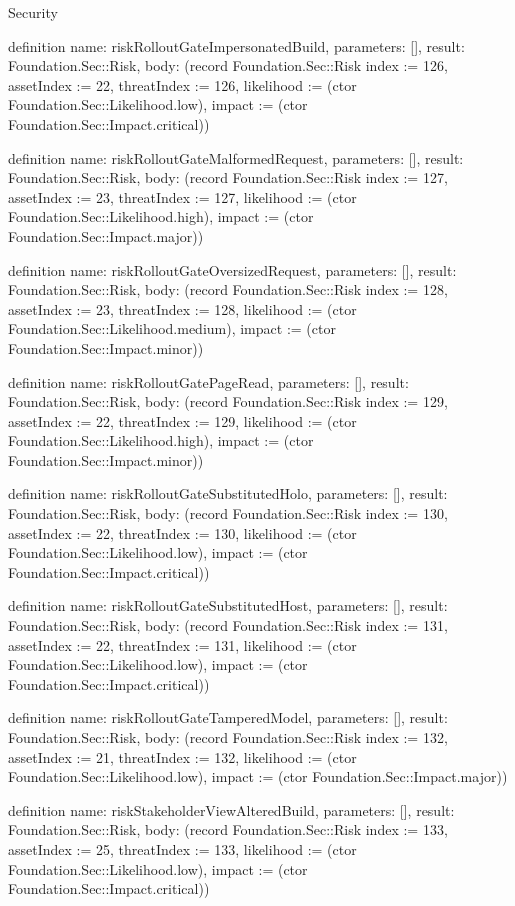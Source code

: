 \begin{lexlean}{Security}
\begin{semanticmodule}
definition{
  name: riskRolloutGateImpersonatedBuild,
  parameters: [],
  result: Foundation.Sec::Risk,
  body: (record Foundation.Sec::Risk {index := 126, assetIndex := 22, threatIndex := 126, likelihood := (ctor Foundation.Sec::Likelihood.low), impact := (ctor Foundation.Sec::Impact.critical)})
}

definition{
  name: riskRolloutGateMalformedRequest,
  parameters: [],
  result: Foundation.Sec::Risk,
  body: (record Foundation.Sec::Risk {index := 127, assetIndex := 23, threatIndex := 127, likelihood := (ctor Foundation.Sec::Likelihood.high), impact := (ctor Foundation.Sec::Impact.major)})
}

definition{
  name: riskRolloutGateOversizedRequest,
  parameters: [],
  result: Foundation.Sec::Risk,
  body: (record Foundation.Sec::Risk {index := 128, assetIndex := 23, threatIndex := 128, likelihood := (ctor Foundation.Sec::Likelihood.medium), impact := (ctor Foundation.Sec::Impact.minor)})
}

definition{
  name: riskRolloutGatePageRead,
  parameters: [],
  result: Foundation.Sec::Risk,
  body: (record Foundation.Sec::Risk {index := 129, assetIndex := 22, threatIndex := 129, likelihood := (ctor Foundation.Sec::Likelihood.high), impact := (ctor Foundation.Sec::Impact.minor)})
}

definition{
  name: riskRolloutGateSubstitutedHolo,
  parameters: [],
  result: Foundation.Sec::Risk,
  body: (record Foundation.Sec::Risk {index := 130, assetIndex := 22, threatIndex := 130, likelihood := (ctor Foundation.Sec::Likelihood.low), impact := (ctor Foundation.Sec::Impact.critical)})
}

definition{
  name: riskRolloutGateSubstitutedHost,
  parameters: [],
  result: Foundation.Sec::Risk,
  body: (record Foundation.Sec::Risk {index := 131, assetIndex := 22, threatIndex := 131, likelihood := (ctor Foundation.Sec::Likelihood.low), impact := (ctor Foundation.Sec::Impact.critical)})
}

definition{
  name: riskRolloutGateTamperedModel,
  parameters: [],
  result: Foundation.Sec::Risk,
  body: (record Foundation.Sec::Risk {index := 132, assetIndex := 21, threatIndex := 132, likelihood := (ctor Foundation.Sec::Likelihood.low), impact := (ctor Foundation.Sec::Impact.major)})
}

definition{
  name: riskStakeholderViewAlteredBuild,
  parameters: [],
  result: Foundation.Sec::Risk,
  body: (record Foundation.Sec::Risk {index := 133, assetIndex := 25, threatIndex := 133, likelihood := (ctor Foundation.Sec::Likelihood.low), impact := (ctor Foundation.Sec::Impact.critical)})
}


\end{semanticmodule}
\end{lexlean}
